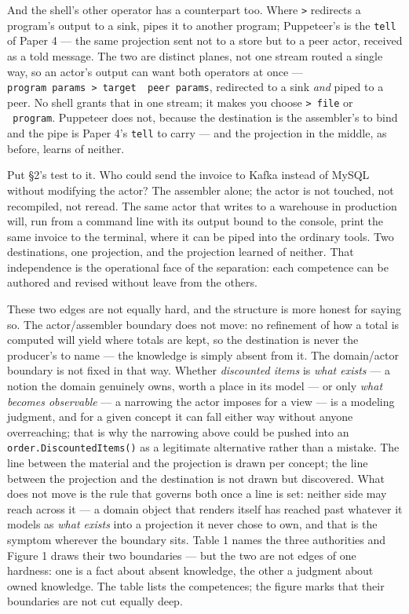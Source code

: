 \documentclass[
]{article}
\begin{document}
And the shell's other operator has a counterpart too. Where
\texttt{\textgreater{}} redirects a program's output to a sink,
\texttt{\textbar{}} pipes it to another program; Puppeteer's
\texttt{\textbar{}} is the \texttt{tell} of Paper 4 --- the same
projection sent not to a store but to a peer actor, received as a told
message. The two are distinct planes, not one stream routed a single
way, so an actor's output can want both operators at once ---
\texttt{program\ params\ \textgreater{}\ target\ \textbar{}\ peer\ params},
redirected to a sink \emph{and} piped to a peer. No shell grants that in
one stream; it makes you choose \texttt{\textgreater{}\ file} or
\texttt{\textbar{}\ program}. Puppeteer does not, because the
destination is the assembler's to bind and the pipe is Paper 4's
\texttt{tell} to carry --- and the projection in the middle, as before,
learns of neither.

Put §2's test to it. Who could send the invoice to Kafka instead of
MySQL without modifying the actor? The assembler alone; the actor is not
touched, not recompiled, not reread. The same actor that writes to a
warehouse in production will, run from a command line with its output
bound to the console, print the same invoice to the terminal, where it
can be piped into the ordinary tools. Two destinations, one projection,
and the projection learned of neither. That independence is the
operational face of the separation: each competence can be authored and
revised without leave from the others.

These two edges are not equally hard, and the structure is more honest
for saying so. The actor/assembler boundary does not move: no refinement
of how a total is computed will yield where totals are kept, so the
destination is never the producer's to name --- the knowledge is simply
absent from it. The domain/actor boundary is not fixed in that way.
Whether \emph{discounted items} is \emph{what exists} --- a notion the
domain genuinely owns, worth a place in its model --- or only \emph{what
becomes observable} --- a narrowing the actor imposes for a view --- is
a modeling judgment, and for a given concept it can fall either way
without anyone overreaching; that is why the narrowing above could be
pushed into an \texttt{order.DiscountedItems()} as a legitimate
alternative rather than a mistake. The line between the material and the
projection is drawn per concept; the line between the projection and the
destination is not drawn but discovered. What does not move is the rule
that governs both once a line is set: neither side may reach across it
--- a domain object that renders itself has reached past whatever it
models as \emph{what exists} into a projection it never chose to own,
and that is the symptom wherever the boundary sits. Table 1 names the
three authorities and Figure 1 draws their two boundaries --- but the
two are not edges of one hardness: one is a fact about absent knowledge,
the other a judgment about owned knowledge. The table lists the
competences; the figure marks that their boundaries are not cut equally
deep.
\end{document}

